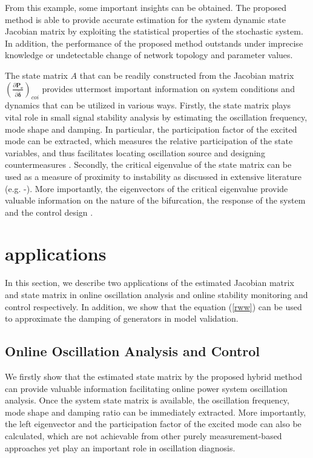 \documentclass[journal]{IEEEtran}
\begin{document}
From this example, some important insights can be obtained. The proposed method is able to provide accurate estimation for the system dynamic state Jacobian matrix by exploiting the statistical properties of the stochastic system. In addition, the performance of the proposed method outstands under imprecise knowledge or undetectable change of network topology and parameter values.

The state matrix $A$ that can be readily constructed from the Jacobian matrix $(\frac{\partial\bm{P_e}}{\partial\bm{\tilde{\delta}}})_{coi}$ provides uttermost important information on system conditions and dynamics that can be utilized in various ways. Firstly, the state matrix plays vital role in small signal stability analysis by estimating the oscillation frequency, mode shape and damping. In particular, the participation factor of the excited mode can be extracted, which measures the relative participation of the state variables, and thus facilitates locating oscillation source and designing countermeasures \cite{Kundur:book}. Secondly, the critical eigenvalue of the state matrix can be used as a measure of proximity to instability as discussed in extensive literature (e.g. \cite{Kundur:1992}-\cite{Cutsem:book}).
More importantly, the eigenvectors of the critical eigenvalue provide valuable information on the nature of the bifurcation, the response of the system and the control design \cite{Cutsem:book}.


\section{applications}\label{sectionapplications}
In this section, we describe two applications of the estimated Jacobian matrix and state matrix in online oscillation analysis and online stability monitoring and control respectively.
In addition, we show that the equation (\ref{rww}) can be used to approximate the damping of generators in model validation.

\subsection{Online Oscillation Analysis and Control}
We firstly show that the estimated state matrix by the proposed hybrid method can provide valuable information facilitating online power system oscillation analysis. Once the system state matrix is available, the oscillation frequency, mode shape and damping ratio can be immediately extracted. More importantly, the left eigenvector and the participation factor of the excited mode can also be calculated, which are not achievable from other purely measurement-based approaches yet play an important role in oscillation diagnosis.
\end{document}
